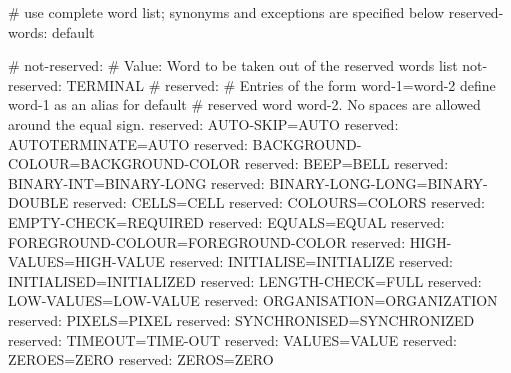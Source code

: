 # use complete word list; synonyms and exceptions are specified below
reserved-words:		default

# not-reserved:
# Value: Word to be taken out of the reserved words list
not-reserved:	TERMINAL
# reserved:
#   Entries of the form word-1=word-2 define word-1 as an alias for default
# reserved word word-2. No spaces are allowed around the equal sign.
reserved:	AUTO-SKIP=AUTO
reserved:	AUTOTERMINATE=AUTO
reserved:	BACKGROUND-COLOUR=BACKGROUND-COLOR
reserved:	BEEP=BELL
reserved:	BINARY-INT=BINARY-LONG
reserved:	BINARY-LONG-LONG=BINARY-DOUBLE
reserved:	CELLS=CELL
reserved:	COLOURS=COLORS
reserved:	EMPTY-CHECK=REQUIRED
reserved:	EQUALS=EQUAL
reserved:	FOREGROUND-COLOUR=FOREGROUND-COLOR
reserved:	HIGH-VALUES=HIGH-VALUE
reserved:	INITIALISE=INITIALIZE
reserved:	INITIALISED=INITIALIZED
reserved:	LENGTH-CHECK=FULL
reserved:	LOW-VALUES=LOW-VALUE
reserved:	ORGANISATION=ORGANIZATION
reserved:	PIXELS=PIXEL
reserved:	SYNCHRONISED=SYNCHRONIZED
reserved:	TIMEOUT=TIME-OUT
reserved:	VALUES=VALUE
reserved:	ZEROES=ZERO
reserved:	ZEROS=ZERO
